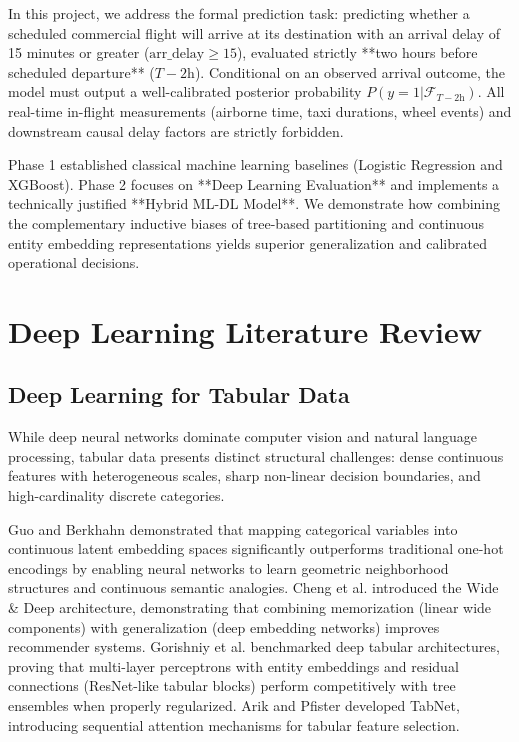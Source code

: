 \documentclass[conference]{IEEEtran}
\begin{document}
In this project, we address the formal prediction task: predicting whether a scheduled commercial flight will arrive at its destination with an arrival delay of 15 minutes or greater ($\text{arr\_delay} \ge 15$), evaluated strictly **two hours before scheduled departure** ($T-2\text{h}$). Conditional on an observed arrival outcome, the model must output a well-calibrated posterior probability $P(y=1 | \mathcal{F}_{T-2\text{h}})$. All real-time in-flight measurements (airborne time, taxi durations, wheel events) and downstream causal delay factors are strictly forbidden.

Phase 1 established classical machine learning baselines (Logistic Regression and XGBoost). Phase 2 focuses on **Deep Learning Evaluation** and implements a technically justified **Hybrid ML-DL Model**. We demonstrate how combining the complementary inductive biases of tree-based partitioning and continuous entity embedding representations yields superior generalization and calibrated operational decisions.

\section{Deep Learning Literature Review}
\subsection{Deep Learning for Tabular Data}
While deep neural networks dominate computer vision and natural language processing, tabular data presents distinct structural challenges: dense continuous features with heterogeneous scales, sharp non-linear decision boundaries, and high-cardinality discrete categories. 

Guo and Berkhahn \cite{guo2016entity} demonstrated that mapping categorical variables into continuous latent embedding spaces significantly outperforms traditional one-hot encodings by enabling neural networks to learn geometric neighborhood structures and continuous semantic analogies. Cheng et al. \cite{cheng2016wide} introduced the Wide \& Deep architecture, demonstrating that combining memorization (linear wide components) with generalization (deep embedding networks) improves recommender systems. Gorishniy et al. \cite{gorishniy2021revisiting} benchmarked deep tabular architectures, proving that multi-layer perceptrons with entity embeddings and residual connections (ResNet-like tabular blocks) perform competitively with tree ensembles when properly regularized. Arik and Pfister \cite{arik2021tabnet} developed TabNet, introducing sequential attention mechanisms for tabular feature selection.
\end{document}
